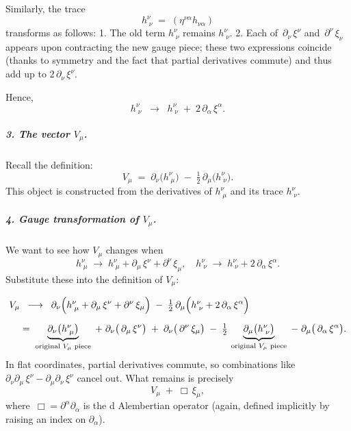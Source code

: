 \vspace{2pt}

\noindent
Similarly, the trace
\[
h^\nu_{\;\nu}
  \;=\;
(\eta^{\nu\alpha} h_{\nu\alpha})
\]
transforms as follows:  
1. The old term \(h^\nu_{\;\nu}\) remains \(h^\nu_{\;\nu}\).  
2. Each of \(\,\partial_\nu\,\xi^\nu\) and \(\,\partial^\nu\,\xi_\nu\) appears upon contracting the new gauge piece; these two expressions coincide (thanks to symmetry and the fact that partial derivatives commute) and thus add up to \(2\,\partial_\nu\,\xi^\nu\).  

Hence,
\[
h^\nu_{\;\nu}
  \;\;\longrightarrow\;\;
h^\nu_{\;\nu}
  \;+\;
2\,\partial_\alpha \,\xi^\alpha.
\]

\medskip

\noindent
\subparagraph{3. The vector \boldmath\(V_\mu\).}
Recall the definition: 
\[
V_\mu
  \;=\; 
\partial_\nu\bigl(h^\nu_{\;\mu}\bigr)
  \;-\;
\tfrac12\,\partial_\mu \bigl(h^\nu_{\;\nu}\bigr).
\]
This object is constructed from the derivatives of \(h^\nu_{\;\mu}\) and its trace \(h^\nu_{\;\nu}\).

\medskip

\noindent
\subparagraph{4. Gauge transformation of \boldmath\(V_\mu\).}
We want to see how \(V_\mu\) changes when
\[
h^\nu_{\;\mu}
  \;\to\;
h^\nu_{\;\mu} + \partial_\mu\,\xi^\nu + \partial^\nu\,\xi_\mu,
\quad
h^\nu_{\;\nu}
  \;\to\;
h^\nu_{\;\nu} + 2\,\partial_\alpha\,\xi^\alpha.
\]
Substitute these into the definition of \(V_\mu\):

\begin{equation}
\begin{aligned}
V_\mu
  &\;\;\longrightarrow\;\;
  \partial_\nu\Bigl(h^\nu_{\;\mu}
                   + \partial_\mu\,\xi^\nu
                   + \partial^\nu\,\xi_\mu
             \Bigr)
    \;-\;
  \tfrac12\,\partial_\mu\Bigl(h^\nu_{\;\nu}
                         + 2\,\partial_\alpha\,\xi^\alpha
                    \Bigr)
\\[6pt]
&=\;
  \underbrace{\partial_\nu \bigl(h^\nu_{\;\mu}\bigr)}_{\text{original }V_\mu\text{ piece}}
  \;+\;
  \partial_\nu\bigl(\,\partial_\mu\,\xi^\nu\bigr)
  \;+\;
  \partial_\nu\bigl(\,\partial^\nu\,\xi_\mu\bigr)
  \;-\;
  \tfrac12\,\underbrace{\partial_\mu\bigl(h^\nu_{\;\nu}\bigr)}_{\text{original }V_\mu\text{ piece}}
  \;-\;
  \partial_\mu\bigl(\,\partial_\alpha\,\xi^\alpha\bigr).
\end{aligned}
\end{equation}
In flat coordinates, partial derivatives commute, so combinations like 
\(\partial_\nu \partial_\mu\,\xi^\nu - \partial_\mu \partial_\nu\,\xi^\nu\) cancel out.  
What remains is precisely
\[
V_\mu
  \;+\;
\Box\,\xi_\mu,
\]
where \(\,\Box = \partial^\alpha \partial_\alpha\) is the d Alembertian operator (again, defined implicitly by raising an index on \(\partial_\alpha\)).


